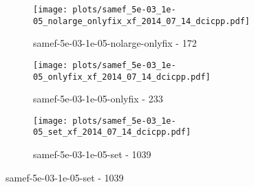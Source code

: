 \begin{figure}[H]
\begin{subfigure}{0.48\textwidth}
  \end{subfigure}
  \begin{subfigure}{0.48\textwidth}
    \texttt{[image: plots/samef\_5e-03\_1e-05\_nolarge\_onlyfix\_xf\_2014\_07\_14\_dcicpp.pdf]}
    \caption{samef-5e-03-1e-05-nolarge-onlyfix - 172}
  \end{subfigure}
  \begin{subfigure}{0.48\textwidth}
    \texttt{[image: plots/samef\_5e-03\_1e-05\_onlyfix\_xf\_2014\_07\_14\_dcicpp.pdf]}
    \caption{samef-5e-03-1e-05-onlyfix - 233}
  \end{subfigure}
  \begin{subfigure}{0.48\textwidth}
    \texttt{[image: plots/samef\_5e-03\_1e-05\_set\_xf\_2014\_07\_14\_dcicpp.pdf]}
    \caption{samef-5e-03-1e-05-set - 1039}
  \end{subfigure}
\end{figure}

